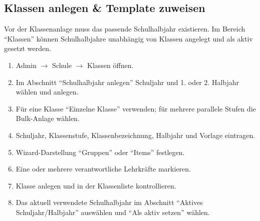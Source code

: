 \documentclass[12pt,a4paper]{article}
\begin{document}
\subsection{Klassen anlegen \& Template zuweisen}\label{sec:klassen-anlegen}
Vor der Klassenanlage muss das passende Schulhalbjahr existieren. Im Bereich \enquote{Klassen} können Schulhalbjahre unabhängig von Klassen angelegt und als aktiv gesetzt werden.
\begin{enumerate}
  \item Admin \(\rightarrow\) Schule \(\rightarrow\) Klassen öffnen.
  \item Im Abschnitt \enquote{Schulhalbjahr anlegen} Schuljahr und 1. oder 2. Halbjahr wählen und anlegen.
  \item Für eine Klasse \enquote{Einzelne Klasse} verwenden; für mehrere parallele Stufen die Bulk-Anlage wählen.
  \item Schuljahr, Klassenstufe, Klassenbezeichnung, Halbjahr und Vorlage eintragen.
  \item Wizard-Darstellung \enquote{Gruppen} oder \enquote{Items} festlegen.
  \item Eine oder mehrere verantwortliche Lehrkräfte markieren.
  \item Klasse anlegen und in der Klassenliste kontrollieren.
  \item Das aktuell verwendete Schulhalbjahr im Abschnitt \enquote{Aktives Schuljahr/Halbjahr} auswählen und \enquote{Als aktiv setzen} wählen.
\end{enumerate}
\end{document}
